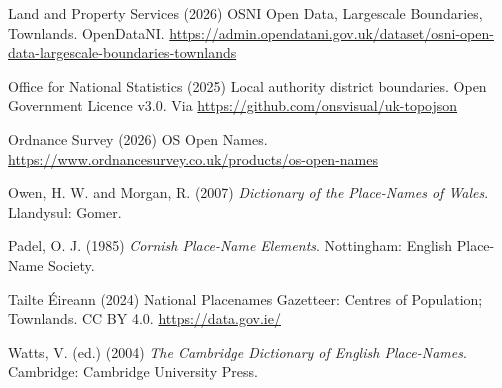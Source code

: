 \documentclass[11pt,a4paper]{article}
\begin{document}
Land and Property Services (2026) OSNI Open Data, Largescale Boundaries, Townlands. OpenDataNI. \url{https://admin.opendatani.gov.uk/dataset/osni-open-data-largescale-boundaries-townlands}

Office for National Statistics (2025) Local authority district boundaries. Open Government Licence v3.0. Via \url{https://github.com/onsvisual/uk-topojson}

Ordnance Survey (2026) OS Open Names. \url{https://www.ordnancesurvey.co.uk/products/os-open-names}

Owen, H. W. and Morgan, R. (2007) \textit{Dictionary of the Place-Names of Wales}. Llandysul: Gomer.

Padel, O. J. (1985) \textit{Cornish Place-Name Elements}. Nottingham: English Place-Name Society.

Tailte Éireann (2024) National Placenames Gazetteer: Centres of Population; Townlands. CC BY 4.0. \url{https://data.gov.ie/}

Watts, V. (ed.) (2004) \textit{The Cambridge Dictionary of English Place-Names}. Cambridge: Cambridge University Press.
\end{document}
